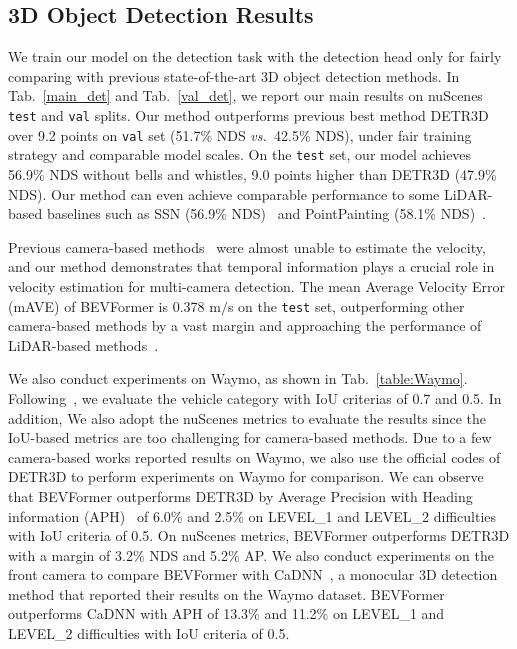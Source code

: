 \documentclass{article}
\begin{document}
\subsection{3D Object Detection Results}

We train our model on the detection task with the detection head only for fairly comparing with previous state-of-the-art 3D object detection methods.
In Tab.~\ref{main_det} and Tab.~\ref{val_det}, we report our main results on nuScenes  \texttt{test} and \texttt{val} splits.  Our method outperforms previous best method DETR3D~\cite{wang2022detr3d} over 9.2 points  on \texttt{val} set (51.7\% NDS \emph{vs.~}42.5\% NDS), under fair training strategy and comparable model scales. On the \texttt{test} set, our model achieves 56.9\% NDS without bells and whistles, 9.0 points higher than DETR3D (47.9\% NDS). Our method can even achieve comparable performance 
to some LiDAR-based baselines such as SSN (56.9\% NDS)~\cite{zhu2020ssn} and PointPainting (58.1\% NDS)~\cite{vora2020pointpainting}. 


Previous camera-based methods~\cite{wang2022detr3d,park2021pseudo,wang2021fcos3d} were almost unable to estimate the velocity, and our method demonstrates that temporal information plays a crucial role in velocity estimation for multi-camera detection.  
The mean Average Velocity Error (mAVE) of BEVFormer is 0.378 m$/$s on the \texttt{test} set, outperforming other camera-based methods by a vast margin and approaching the performance of LiDAR-based methods~\cite{vora2020pointpainting}.

We also conduct experiments on Waymo, as shown in Tab.~\ref{table:Waymo}. Following~\cite{reading2021categorical}, we evaluate the  vehicle category with IoU criterias of 0.7 and 0.5. In addition, We also adopt the nuScenes metrics to evaluate the results since the IoU-based metrics are too challenging for camera-based methods. Due to a few camera-based works reported results on Waymo, we also use the official codes of DETR3D to perform experiments on Waymo for comparison. We can observe that BEVFormer outperforms DETR3D by Average Precision with Heading information (APH)~\cite{sun2020scalability} of 6.0\% and 2.5\% on LEVEL\_1 and LEVEL\_2 difficulties with IoU criteria of 0.5. On nuScenes metrics, BEVFormer outperforms DETR3D with a margin of 3.2\% NDS and 5.2\% AP. We also conduct experiments on the front camera to compare BEVFormer with CaDNN~\cite{reading2021categorical}, a monocular 3D detection method that reported their results on the Waymo dataset. BEVFormer outperforms CaDNN with APH of 13.3\% and 11.2\% on LEVEL\_1 and LEVEL\_2 difficulties with IoU criteria of 0.5. 
\end{document}
